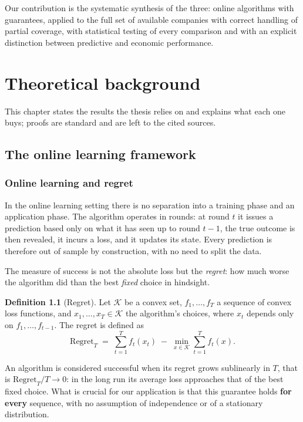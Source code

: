 \documentclass[12pt,a4paper,oneside]{report}
\renewcommand{\_}{\oldunderscore\allowbreak}
\theoremstyle{definition}
\newtheorem{definition}{Definition}[chapter]
\theoremstyle{plain}
\theoremstyle{remark}
\begin{document}
Our contribution is the systematic synthesis of the three: online algorithms with guarantees,
applied to the full set of available companies with correct handling of partial coverage, with
statistical testing of every comparison and with an explicit distinction between predictive
and economic performance.

\chapter{Theoretical background}
\label{ch:theory}

This chapter states the results the thesis relies on and explains what each one buys; proofs are
standard and are left to the cited sources.

\section{The online learning framework}

\subsection{Online learning and regret}

In the online learning setting there is no separation into a training phase and an application
phase. The algorithm operates in rounds: at round $t$ it issues a prediction based only on
what it has seen up to round $t-1$, the true outcome is then revealed, it incurs a loss, and
it updates its state. Every prediction is therefore out of sample by construction, with no
need to split the data.

The measure of success is not the absolute loss but the \emph{regret}: how much worse the
algorithm did than the best \emph{fixed} choice in hindsight.

\begin{definition}[Regret]
Let $\mathcal{K}$ be a convex set, $f_1,\dots,f_T$ a sequence of convex loss functions, and
$x_1,\dots,x_T \in \mathcal{K}$ the algorithm's choices, where $x_t$ depends only on
$f_1,\dots,f_{t-1}$. The regret is defined as
\[
\mathrm{Regret}_T \;=\; \sum_{t=1}^{T} f_t(x_t) \;-\; \min_{x \in \mathcal{K}} \sum_{t=1}^{T} f_t(x).
\]
\end{definition}

An algorithm is considered successful when its regret grows sublinearly in $T$, that is
$\mathrm{Regret}_T / T \to 0$: in the long run its average loss approaches that of the best
fixed choice. What is crucial for our application is that this guarantee holds \textbf{for
every} sequence, with no assumption of independence or of a stationary distribution.
\end{document}
